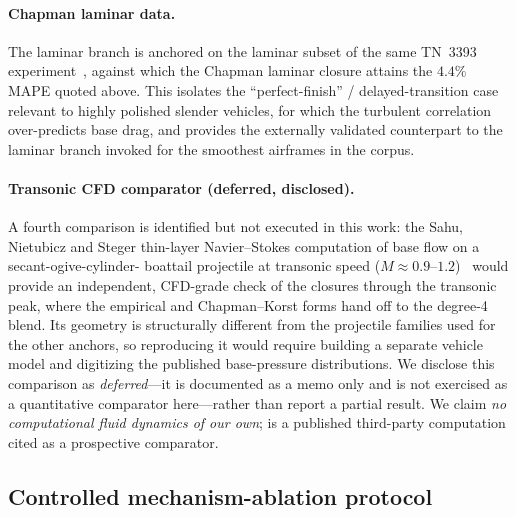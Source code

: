 \paragraph{Chapman laminar data.} The laminar branch is anchored on the laminar
subset of the same TN~3393 experiment~\cite{chapman1955}, against which the
Chapman laminar closure attains the $4.4\%$ MAPE quoted above. This isolates the
``perfect-finish'' / delayed-transition case relevant to highly polished slender
vehicles, for which the turbulent correlation over-predicts base drag, and
provides the externally validated counterpart to the laminar branch invoked for
the smoothest airframes in the corpus.

\paragraph{Transonic CFD comparator (deferred, disclosed).} A fourth comparison is
identified but not executed in this work: the Sahu, Nietubicz and Steger
thin-layer Navier--Stokes computation of base flow on a secant-ogive-cylinder-%
boattail projectile at transonic speed
($M \approx 0.9$--$1.2$)~\cite{sahu1983} would provide an independent, CFD-grade
check of the closures through the transonic peak, where the empirical and
Chapman--Korst forms hand off to the degree-4 blend. Its geometry is structurally
different from the projectile families used for the other anchors, so reproducing
it would require building a separate vehicle model and digitizing the published
base-pressure distributions. We disclose this comparison as \emph{deferred}---it
is documented as a memo only and is not exercised as a quantitative comparator
here---rather than report a partial result. We claim \emph{no computational fluid
dynamics of our own}; \cite{sahu1983} is a published third-party computation cited
as a prospective comparator.

\subsection{Controlled mechanism-ablation protocol}
\label{sec:method-ablation}

